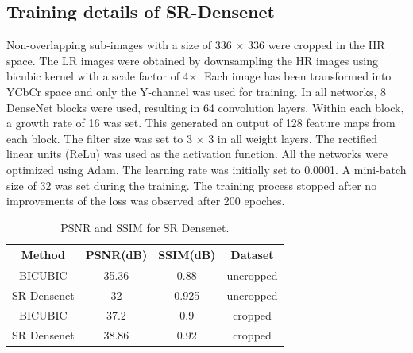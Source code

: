 
\subsection{Training details of SR-Densenet}
Non-overlapping sub-images with a size of 336 × 336 were cropped in the HR space. The LR images were obtained by downsampling the HR images using bicubic kernel with a scale factor of 4×. Each image has been transformed into YCbCr space and only the Y-channel was used for training. In all networks, 8 DenseNet blocks were used, resulting in 64 convolution layers. Within each block, a growth rate of 16 was set. This generated an output of 128 feature maps from each block. The filter size was set to 3 × 3 in all weight layers. The rectified linear units (ReLu) was used as the activation function. All the networks were optimized using Adam. The learning rate was initially set to 0.0001. A mini-batch size of 32 was set during the training. The training process stopped after no improvements of the loss was observed after 200 epoches.
\begin{table}[H]
\centering
\caption{PSNR and SSIM for SR Densenet.}
\begin{tabular}{ |c|c|c|c| }
\hline
 Method & PSNR(dB) & SSIM(dB) & Dataset \\ 
  \hline
 BICUBIC &	35.36 &	0.88 & uncropped \\
 SR Densenet &	32 &	0.925 & uncropped \\
 BICUBIC &	37.2 &	0.9 & cropped \\
 SR Densenet &	38.86	& 0.92 & cropped\\
\hline
\end{tabular}
\label{Table:5.3}
\end{table}
